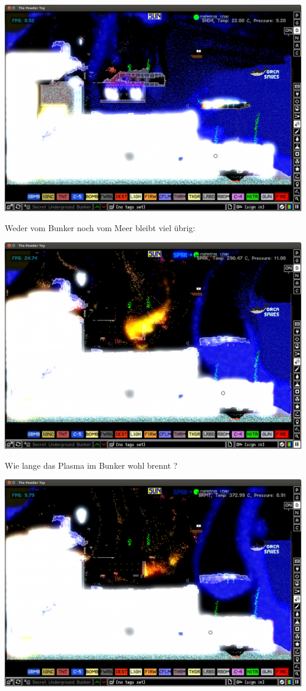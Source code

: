 \documentclass[10pt,a4paper,ngerman,twoside]{article} %
\begin{document}
\begin{multicols}{2}
\begin{center}
\includegraphics[width=\linewidth]{powdertoy/powdertoy-bu13.png}
\end{center}
Weder vom Bunker noch vom Meer bleibt viel übrig:
\begin{center}
\includegraphics[width=\linewidth]{powdertoy/powdertoy-bu14.png}
\end{center}
Wie lange das Plasma im Bunker wohl brennt ?
\begin{center}
\includegraphics[width=\linewidth]{powdertoy/powdertoy-bu15.png}

\end{center}
\end{multicols}
\end{document}
